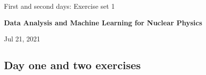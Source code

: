 \documentclass[%
oneside,                 %
final,                   %
10pt]{article}
\begin{document}

\newcommand{\exercisesection}[1]{\subsection*{#1}}






\thispagestyle{empty}

\begin{center}
{\LARGE\bf
\begin{spacing}{1.25}
First and second days: Exercise set 1
\end{spacing}
}
\end{center}


\begin{center}
{\bf Data Analysis and Machine Learning for Nuclear Physics${}^{}$} \\ [0mm]
\end{center}

\begin{center}
\end{center}
    

\begin{center}
Jul 21, 2021
\end{center}

\vspace{1cm}


\subsection{Day one and two  exercises}
\end{document}
